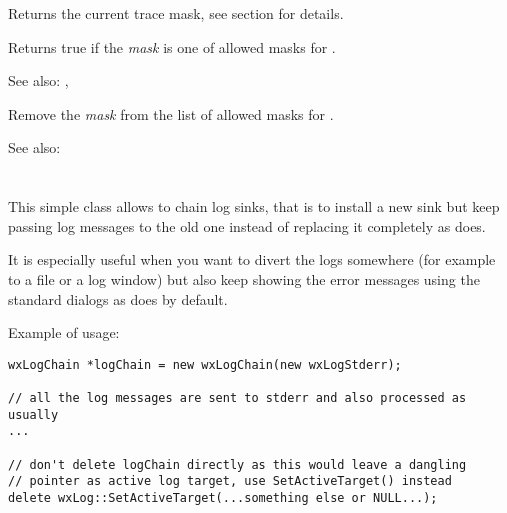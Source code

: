 Returns the current trace mask, see  section
for details.

\label{wxlogisallowedtracemask}


Returns true if the {\it mask} is one of allowed masks for
.

See also: ,

\label{wxlogremovetracemask}


Remove the {\it mask} from the list of allowed masks for
.

See also: 


\section{}\label{wxlogchain}

This simple class allows to chain log sinks, that is to install a new sink but
keep passing log messages to the old one instead of replacing it completely as
 does.

It is especially useful when you want to divert the logs somewhere (for
example to a file or a log window) but also keep showing the error messages
using the standard dialogs as  does by default.

Example of usage:

\begin{verbatim}
wxLogChain *logChain = new wxLogChain(new wxLogStderr);

// all the log messages are sent to stderr and also processed as usually
...

// don't delete logChain directly as this would leave a dangling
// pointer as active log target, use SetActiveTarget() instead
delete wxLog::SetActiveTarget(...something else or NULL...);

\end{verbatim}

